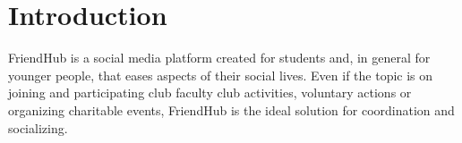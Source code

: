 \chapter*{Introduction} 
FriendHub is a social media platform created for students and, in general for younger people, that eases aspects of their social lives. Even if the topic is on joining and participating club faculty club activities, voluntary actions or organizing charitable events, FriendHub is the ideal solution for coordination and socializing.
\newpage